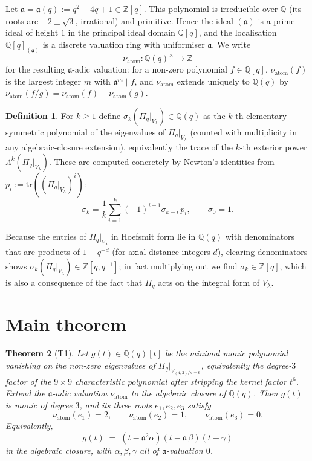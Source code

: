\documentclass[11pt]{article}
\theoremstyle{plain}
\newtheorem{theorem}{Theorem}
\theoremstyle{definition}
\newtheorem{definition}[theorem]{Definition}
\theoremstyle{remark}
\newcommand{\Z}{\mathbb{Z}}
\newcommand{\Q}{\mathbb{Q}}
\newcommand{\Pibs}{\Pi_q}
\newcommand{\Vlam}{V_\lambda}
\newcommand{\trace}{\mathrm{tr}}
\newcommand{\val}{\nu_{\mathrm{atom}}}
\newcommand{\atom}{\mathfrak{a}}
\begin{document}
Let $\atom = \atom(q) := q^2 + 4q + 1 \in \Z[q]$.  This polynomial is irreducible
over $\Q$ (its roots are $-2 \pm \sqrt{3}$, irrational) and primitive.  Hence the
ideal $(\atom)$ is a prime ideal of height $1$ in the principal ideal domain
$\Q[q]$, and the localisation $\Q[q]_{(\atom)}$ is a discrete valuation ring with
uniformiser $\atom$.  We write
\[ \val \colon \Q(q)^\times \longrightarrow \Z \]
for the resulting $\atom$-adic valuation: for a non-zero polynomial $f \in \Q[q]$,
$\val(f)$ is the largest integer $m$ with $\atom^m \mid f$, and $\val$ extends
uniquely to $\Q(q)$ by $\val(f/g) = \val(f) - \val(g)$.

\begin{definition}
For $k \geq 1$ define $\sigma_k(\Pibs|_{\Vlam}) \in \Q(q)$ as the $k$-th elementary
symmetric polynomial of the eigenvalues of $\Pibs|_{\Vlam}$ (counted with
multiplicity in any algebraic-closure extension), equivalently the trace of the
$k$-th exterior power $\Lambda^k(\Pibs|_{\Vlam})$.  These are computed concretely
by Newton's identities from $p_i := \trace((\Pibs|_{\Vlam})^i)$:
\[ \sigma_k = \frac{1}{k}\sum_{i=1}^{k} (-1)^{i-1} \sigma_{k-i}\, p_i,
   \qquad \sigma_0 = 1. \]
\end{definition}

Because the entries of $\Pibs|_{\Vlam}$ in Hoefsmit form lie in $\Q(q)$ with
denominators that are products of $1 - q^{-d}$ (for axial-distance integers $d$),
clearing denominators shows $\sigma_k(\Pibs|_{\Vlam}) \in \Z[q,q^{-1}]$; in fact
multiplying out we find $\sigma_k \in \Z[q]$, which is also a consequence of the
fact that $\Pibs$ acts on the integral form of $\Vlam$.

\section{Main theorem}

\begin{theorem}[T1]
\label{thm:main}
Let $g(t) \in \Q(q)[t]$ be the minimal monic polynomial vanishing on the non-zero
eigenvalues of $\Pibs|_{V_{(4,2)/n=6}}$, equivalently the degree-$3$ factor of the
$9\times 9$ characteristic polynomial after stripping the kernel factor $t^6$.
Extend the $\atom$-adic valuation $\val$ to the algebraic closure of $\Q(q)$.
Then $g(t)$ is monic of degree $3$, and its three roots $e_1, e_2, e_3$ satisfy
\[ \val(e_1) = 2, \qquad \val(e_2) = 1, \qquad \val(e_3) = 0. \]
Equivalently,
\[ g(t) \;=\; (t - \atom^2 \alpha)(t - \atom\, \beta)(t - \gamma) \]
in the algebraic closure, with $\alpha, \beta, \gamma$ all of $\atom$-valuation $0$.
\end{theorem}
\end{document}
